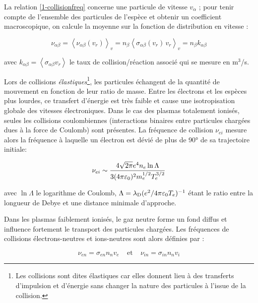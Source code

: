 \begin{refsection}
La relation \eqref{1-collisionfreq}
concerne une particule de vitesse $v_\alpha$ ; pour tenir compte de l'ensemble des particules
de l'espèce et obtenir un coefficient macroscopique, on calcule la moyenne sur
la fonction de distribution en vitesse :

\begin{equation}
\label{1-collisionfreqMacro}
	\nu_{\alpha\beta}=\left<\nu_{\alpha
	\beta}(v_r)\right>_v=n_\beta\left<\sigma_{\alpha
	\beta}(v_r)\,v_r\right>_v=n_\beta k_{\alpha
	\beta}
\end{equation}

avec $k_{\alpha\beta}=\left<\sigma_{\alpha\beta}
v_r\right>$ le taux de collision/réaction associé qui se mesure en m$^{3}$/s.

Lors de collisions \emph{élastiques}\footnote{Les collisions sont dites élastiques car
elles donnent lieu à des transferts d'impulsion et d'énergie sans changer
la nature des particules à l'issue de la collision.}, les particules échangent
de la quantité de mouvement en fonction de leur ratio de masse. Entre les
électrons et les espèces plus lourdes, ce transfert d'énergie est très faible et cause une isotropisation
globale des vitesses électroniques.
Dans le cas des plasmas totalement ionisés, seules les collisions coulombiennes 
(interactions binaires entre particules chargées dues à la force de Coulomb)
sont présentes. 
La fréquence de collision $\nu_{ei}$ mesure alors la fréquence à laquelle un
électron est dévié de plus de 90° de sa trajectoire initiale:

\begin{equation}
	\nu_{ei}\sim\frac{4\sqrt{2\pi}e^{{4}} n_{e} \ln\Lambda
	}{3(4\pi\varepsilon{_{0}})^{{2}}m_{e}^{{1/2}}T_{e}^{{3/2}}}
\end{equation}

avec $\ln \Lambda$ le logarithme de Coulomb,
$\Lambda=\lambda_\text{D}(e^{{2}}/4\pi\varepsilon{_{0}}
T_{e})^{{-1}}$ étant le ratio entre la longueur de Debye et une
distance minimale d'approche.

Dans les plasmas faiblement ionisés, le
gaz neutre forme un fond diffus et influence fortement le transport des particules chargées.
Les fréquences de collisions électrons-neutres et ions-neutres sont alors
définies par :

\begin{equation}
	\nu_{en}=\sigma_{en} n_{n} v_{e}
	\;\;\;\;\text{et}\;\;\;\;\nu_{in}=\sigma_{in} n_{n} v_{i}
\end{equation} 
 

\end{refsection}
